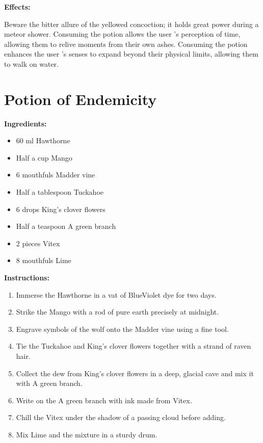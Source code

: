 \documentclass{article}
\begin{document}
\textbf{Effects:}

Beware the bitter allure of the yellowed concoction; it holds great power during a meteor shower. Consuming the potion allows the user 's perception of time, allowing them to relive moments from their own ashes. Consuming the potion enhances the user 's senses to expand beyond their physical limits, allowing them to walk on water.

\newpage
\section*{Potion of Endemicity}

\textbf{Ingredients:}

\begin{itemize}
  \item 60 ml Hawthorne
  \item Half a cup Mango
  \item 6 mouthfuls Madder vine
  \item Half a tablespoon Tuckahoe
  \item 6 drops King's clover flowers
  \item Half a teaspoon A green branch
  \item 2 pieces Vitex
  \item 8 mouthfuls Lime
\end{itemize}

\textbf{Instructions:}

\begin{enumerate}
  \item Immerse the Hawthorne in a vat of BlueViolet dye for two days.
  \item Strike the Mango with a rod of pure earth precisely at midnight.
  \item Engrave symbols of the wolf onto the Madder vine using a fine tool.
  \item Tie the Tuckahoe and King's clover flowers together with a strand of raven hair.
  \item Collect the dew from King's clover flowers in a deep, glacial cave and mix it with A green branch.
  \item Write on the A green branch with ink made from Vitex.
  \item Chill the Vitex under the shadow of a passing cloud before adding.
  \item Mix Lime and the mixture in a sturdy drum.
\end{enumerate}
\end{document}

